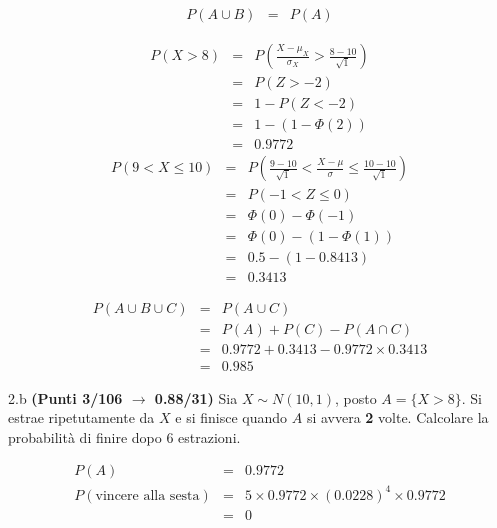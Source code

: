 \documentclass[
  11pt,
]{book}
\theoremstyle{mytheoremstyle}
\theoremstyle{mydefstyle}
\newenvironment{sol}
  {
  \begin{tcolorbox}[enhanced,breakable,arc=0.1mm,boxrule=1pt,colback=white,colframe=iblue,
  title=\bf \fontfamily{lmss}\selectfont \hspace{.5 cm} Soluzione,drop fuzzy shadow]

}{
\end{tcolorbox}
  }
\begin{document}
\begin{sol}
\begin{eqnarray*}
P(A\cup B)&=&P(A)
\end{eqnarray*}

\begin{eqnarray*}
      P( X   >   8 ) 
        &=& P\left(  \frac { X  -  \mu_X }{ \sigma_X }  >  \frac { 8  -  10 }{\sqrt{ 1 }} \right)  \\
                 &=& P\left(  Z   >   -2 \right) \\    &=& 1-P(Z< -2 )\\ 
                 &=&  1-(1-\Phi( 2 )) \\ &=&  0.9772 
      \end{eqnarray*}\begin{eqnarray*}
   P( 9 < X \leq  10 ) &=& P\left( \frac { 9  -  10 }{\sqrt{ 1 }} < \frac { X  -  \mu }{ \sigma } \leq \frac { 10  -  10 }{\sqrt{ 1 }}\right)  \\
              &=& P\left(  -1  < Z \leq  0 \right) \\
              &=& \Phi( 0 )-\Phi( -1 )\\
              &=&  \Phi( 0 )-(1-\Phi( 1 )) \\ &=&  0.5 -(1- 0.8413 ) \\ 
              &=&  0.3413 
   \end{eqnarray*}

\begin{eqnarray*}
P(A\cup B\cup C)&=&P(A\cup C)\\
&=&P(A)+P(C)-P(A\cap C)\\
&=& 0.9772 +0.3413-0.9772\times 0.3413\\
&=& 0.985
\end{eqnarray*}

\end{sol}

2.b \textbf{(Punti 3/106 \(\rightarrow\) 0.88/31)} Sia \(X\sim N(10,1)\), posto \(A=\{X>8\}\). Si estrae ripetutamente da \(X\) e si finisce quando \(A\) si avvera \textbf{2} volte. Calcolare la probabilità di finire dopo 6 estrazioni.

\begin{sol}
\begin{eqnarray*}
P(A)&=&0.9772\\
P(\text{vincere alla sesta})&=&5\times0.9772\times (0.0228)^4\times 0.9772\\
&=& 0
\end{eqnarray*}

\end{sol}
\end{document}
